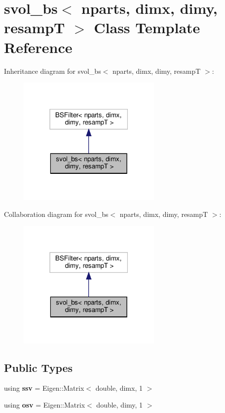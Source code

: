 \hypertarget{classsvol__bs}{}\section{svol\+\_\+bs$<$ nparts, dimx, dimy, resampT $>$ Class Template Reference}
\label{classsvol__bs}


Inheritance diagram for svol\+\_\+bs$<$ nparts, dimx, dimy, resampT $>$\+:
\nopagebreak
\begin{figure}[H]
\begin{center}
\leavevmode
\includegraphics[width=198pt]{classsvol__bs__inherit__graph}
\end{center}
\end{figure}


Collaboration diagram for svol\+\_\+bs$<$ nparts, dimx, dimy, resampT $>$\+:
\nopagebreak
\begin{figure}[H]
\begin{center}
\leavevmode
\includegraphics[width=198pt]{classsvol__bs__coll__graph}
\end{center}
\end{figure}
\subsection*{Public Types}
\begin{DoxyCompactItemize}
\item 
\mbox{\label{classsvol__bs_a4901395fcf0f3c64f90d05c66339fe0e}} 
using {\bfseries ssv} = Eigen\+::\+Matrix$<$ double, dimx, 1 $>$
\item 
\mbox{\label{classsvol__bs_ada43d30435c238bad4e7affffc316db7}} 
using {\bfseries osv} = Eigen\+::\+Matrix$<$ double, dimy, 1 $>$
\end{DoxyCompactItemize}
